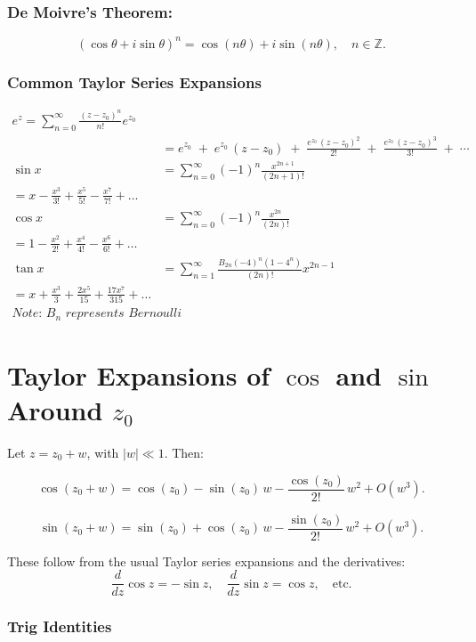 \documentclass[12pt]{article}
\theoremstyle{definition} %
\theoremstyle{plain} %
\begin{document}
\subsubsection*{De Moivre's Theorem:}
\[
(\cos \theta + i \sin \theta)^n = \cos(n\theta) + i\sin(n\theta), \quad n \in \mathbb{Z}.
\]

\subsubsection*{Common Taylor Series Expansions}
\begin{align}
    e^z = \sum_{n=0}^{\infty} \frac{(z - z_0)^n}{n!} e^{z_0}\\
&= 
e^{z_0} 
\;+\; e^{z_0}\,(z - z_0) 
\;+\; \frac{e^{z_0}\,(z - z_0)^2}{2!}
\;+\; \frac{e^{z_0}\,(z - z_0)^3}{3!}
\;+\; \cdots
\\
    \sin x &= \sum_{n=0}^{\infty} (-1)^n \frac{x^{2n+1}}{(2n+1)!} \\
    = x - \frac{x^3}{3!} + \frac{x^5}{5!} - \frac{x^7}{7!} + \dots \\[8pt]
    \cos x &= \sum_{n=0}^{\infty} (-1)^n \frac{x^{2n}}{(2n)!} \\
    = 1 - \frac{x^2}{2!} + \frac{x^4}{4!} - \frac{x^6}{6!} + \dots \\[8pt]
    \tan x &= \sum_{n=1}^{\infty} \frac{B_{2n}(-4)^n(1-4^n)}{(2n)!} x^{2n-1}\\
    = x + \frac{x^3}{3} + \frac{2x^5}{15} + \frac{17x^7}{315} + \dots\\
    \textit{Note: \(B_n\) represents Bernoulli numbers.}
\end{align}
\section*{Taylor Expansions of \(\cos\) and \(\sin\) Around \(z_0\)}

Let \(z = z_0 + w\), with \(|w|\ll 1\). Then:

\[
\cos(z_0 + w)
= \cos(z_0) 
- \sin(z_0)\,w
- \frac{\cos(z_0)}{2!}\,w^2
+ O(w^3).
\]

\[
\sin(z_0 + w)
= \sin(z_0)
+ \cos(z_0)\,w
- \frac{\sin(z_0)}{2!}\,w^2
+ O(w^3).
\]

These follow from the usual Taylor series expansions and the derivatives:
\[
\frac{d}{dz}\cos z = -\sin z,\quad
\frac{d}{dz}\sin z = \cos z,\quad \text{etc.}
\]

\subsubsection*{Trig Identities}
\end{document}
